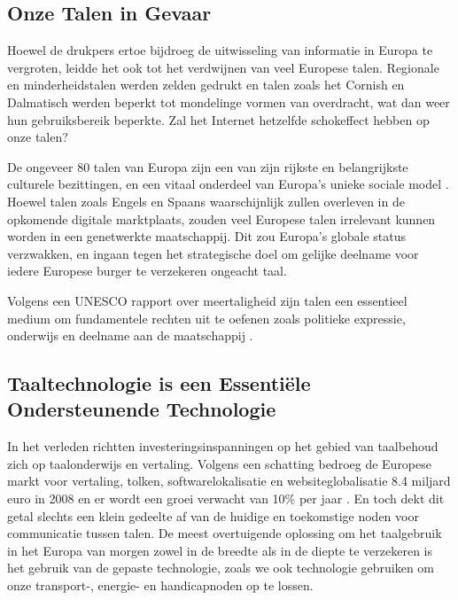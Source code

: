 \begin{multicols}{2}
\subsection{Onze Talen in Gevaar}

    Hoewel de drukpers ertoe bijdroeg de uitwisseling van informatie in Europa te vergroten, leidde het ook tot het verdwijnen van veel Europese talen. Regionale en minderheidstalen werden zelden gedrukt en talen zoals het Cornish en Dalmatisch werden beperkt tot mondelinge vormen van overdracht, wat dan weer hun gebruiksbereik beperkte. Zal het Internet hetzelfde schokeffect hebben op onze talen?


    De ongeveer 80 talen van Europa zijn een van zijn rijkste en belangrijkste culturele bezittingen, en een vitaal onderdeel van Europa's unieke sociale model \cite{EC2}.  Hoewel talen zoals Engels en Spaans waarschijnlijk zullen overleven in de opkomende digitale marktplaats, zouden veel Europese talen irrelevant kunnen worden in een genetwerkte maatschappij. Dit zou Europa's globale status verzwakken, en ingaan tegen het strategische doel om gelijke deelname voor iedere Europese burger te verzekeren ongeacht taal.

Volgens een UNESCO rapport over meertaligheid zijn talen een essentieel medium om fundamentele rechten uit te oefenen zoals politieke expressie, onderwijs en deelname aan de maatschappij \cite{Unesco1}.


\subsection{Taaltechnologie is een Essenti{\"e}le Ondersteunende Technologie}

    In het verleden richtten investeringsinspanningen op het gebied van taalbehoud zich op taalonderwijs en vertaling. Volgens een schatting bedroeg de Europese markt voor vertaling, tolken, softwarelokalisatie en websiteglobalisatie 8.4 miljard euro in 2008 en er wordt een groei verwacht van 10\% per jaar \cite{EC3}.  En toch dekt dit getal slechts een klein gedeelte af van de huidige en toekomstige noden voor communicatie tussen talen. De meest overtuigende oplossing om het taalgebruik in het Europa van morgen zowel in de breedte als in de diepte te verzekeren is het gebruik van de gepaste technologie, zoals we ook technologie gebruiken om onze transport-, energie- en handicapnoden op te lossen.


\end{multicols}
